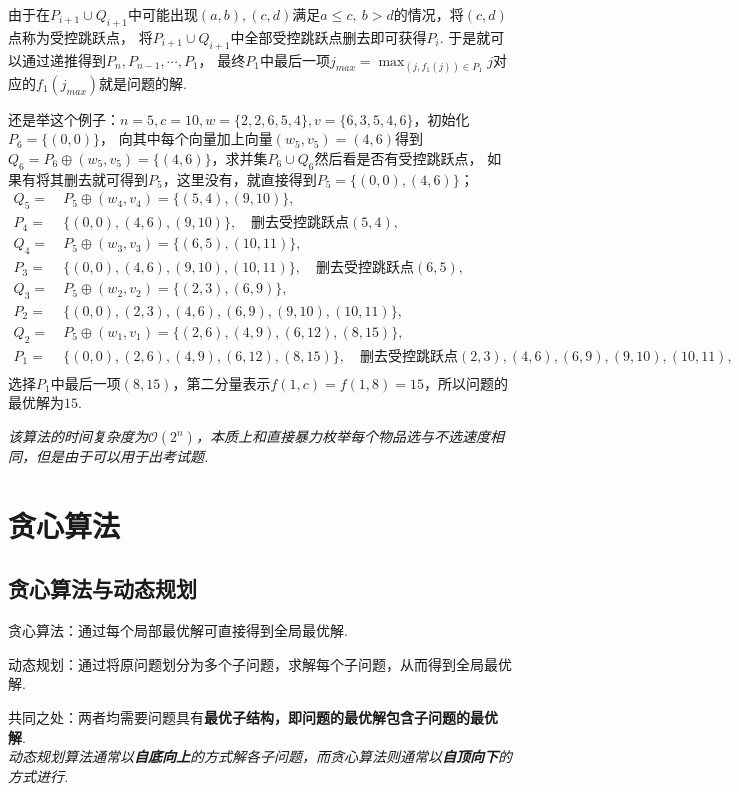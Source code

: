 \documentclass[12pt, a4paper, oneside]{ctexart}
\numberwithin{equation}{section}  %
\theoremstyle{definition}
\let\leq=\leqslant %
\def\O{\mathcal{O}}         %
\def\del{\vspace{-1.5ex}}   %
\begin{document}
由于在$P_{i+1}\cup Q_{i+1}$中可能出现$(a,b),(c,d)$满足$a\leq c,\ b>d$的情况，将$(c,d)$点称为受控跳跃点，
将$P_{i+1}\cup Q_{i+1}$中全部受控跳跃点删去即可获得$P_i$. 于是就可以通过递推得到$P_n,P_{n-1},\cdots,P_1$，
最终$P_1$中最后一项$j_{max} = \max_{(j, f_1(j))\in P_1}j$对应的$f_1(j_{max})$就是问题的解.

还是举这个例子：$n=5,c=10,w = \{2,2,6,5,4\},v=\{6,3,5,4,6\}$，初始化$P_6 = \{(0,0)\}$，
向其中每个向量加上向量$(w_5,v_5)=(4,6)$得到$Q_6 =P_6\oplus(w_5,v_5) = \{(4,6)\}$，求并集$P_6\cup Q_6$然后看是否有受控跳跃点，
如果有将其删去就可得到$P_5$，这里没有，就直接得到$P_5 = \{(0,0),(4,6)\}$；\del
\begin{align*}
    Q_5 =&\ P_5 \oplus (w_4,v_4) =  \{(5, 4), (9, 10)\},\\
    P_4 =&\ \{(0, 0), (4, 6), (9, 10)\},\quad\text{删去受控跳跃点}(5,4),\\
    Q_4 =&\ P_5 \oplus (w_3,v_3) =  \{(6,5),(10,11)\},\\
    P_3 =&\ \{(0, 0), (4, 6), (9, 10), (10, 11)\},\quad\text{删去受控跳跃点}(6,5),\\
    Q_3 =&\ P_5 \oplus (w_2,v_2) =  \{(2, 3), (6, 9)\},\\
    P_2 =&\ \{(0, 0), (2,3), (4, 6), (6, 9), (9, 10), (10, 11)\},\\
    Q_2 =&\ P_5 \oplus (w_1,v_1) =  \{(2,6),(4,9),(6,12),(8,15)\},\\
    P_1 =&\ \{(0, 0), (2,6), (4, 9), (6,12), (8, 15)\},\quad\text{删去受控跳跃点}(2,3),(4,6),(6,9),(9,10),(10,11),\\
\end{align*}
选择$P_1$中最后一项$(8,15)$，第二分量表示$f(1,c) = f(1,8) = 15$，所以问题的最优解为$15$.

\textit{该算法的时间复杂度为$\O(2^n)$，本质上和直接暴力枚举每个物品选与不选速度相同，但是由于可以用于出考试题.}
\section{贪心算法}
\subsection{贪心算法与动态规划}
贪心算法：通过每个局部最优解可直接得到全局最优解.

动态规划：通过将原问题划分为多个子问题，求解每个子问题，从而得到全局最优解.

共同之处：两者均需要问题具有\textbf{最优子结构，即问题的最优解包含子问题的最优解}. \\
\textit{动态规划算法通常以\textbf{自底向上}的方式解各子问题，而贪心算法则通常以\textbf{自顶向下}的方式进行.}
\end{document}

